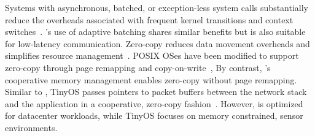 \begin{comment}
  \myparagraph{User-level networking stacks:} User-level network
  stacks~\cite{jeong2014mtcp, sandstorm, openonload} can outperform
  kernel-based implementations through specialization and elimination
  of redundant layers and abstractions, but trade-off performance for
  a weaker security model.  The \ix dataplane demonstrates that a
  specialized networking stack can offer performance and cooperate
  with applications without having to weaken security and isolation
  properties.
 
  \myparagraph{Hardware and protocol specialization:} Applications can
  use a connection-less UDP-based protocol for
  scalability~\cite{DBLP:conf/nsdi/NishtalaFGKLLMPPSSTV13}.
  Latency-sensitive datacenter applications can use specialized
  Infiniband adapters to expose RDMA with $1-3$\microsecond latencies
  to
  applications~\cite{dragojevic14farm,DBLP:conf/icpp/JoseSLZHWIOWSP11,
    mitchell:rdma, DBLP:conf/sosp/OngaroRSOR11}.  Specialized FGPAs
  can replace conventional servers for important applications such as
  memcached~\cite{DBLP:conf/hotcloud/BlottKLVBI13,DBLP:conf/fpga/ChalamalasettiLWARM13,HPHA:Tanaka:2014}.
  \ix is designed to allow TCP/IP to scale with architectural trends
  by eliminating kernel bottlenecks.
\end{comment}


 Systems with
asynchronous, batched, or exception-less system calls substantially
reduce the overheads associated with frequent kernel transitions and
context
switches~\cite{DBLP:conf/osdi/HanMCR12,jeong2014mtcp,DBLP:journals/cacm/Rizzo12,DBLP:conf/osdi/SoaresS10}. \ix's
use of adaptive batching shares similar benefits but is also suitable
for low-latency communication.  Zero-copy reduces data movement
overheads and simplifies resource
management~\cite{DBLP:journals/tocs/PaiDZ00}. POSIX OSes have been
modified to support zero-copy through page remapping and
copy-on-write~\cite{DBLP:conf/usenix/Chu96}, By contrast, \ix's
cooperative memory management enables zero-copy without page
remapping. Similar to \ix, TinyOS passes pointers to packet buffers
between the network stack and the application in a cooperative,
zero-copy fashion~\cite{tinyosnet}.
However, \ix is optimized for datacenter
workloads, while TinyOS focuses on memory constrained, sensor
environments.

